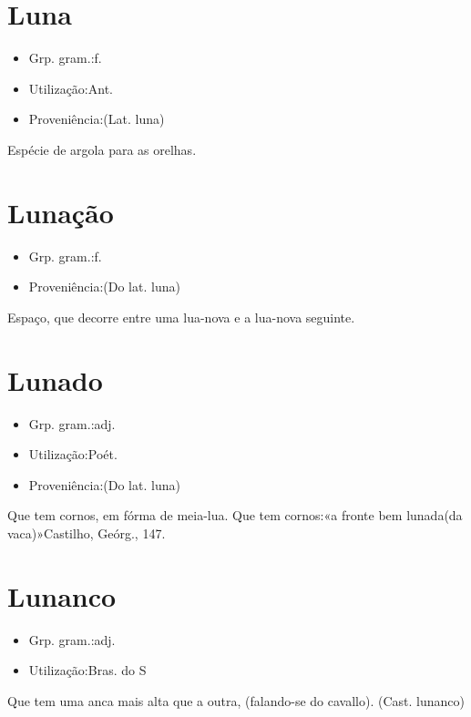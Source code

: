 \section{Luna}
\begin{itemize}
\item {Grp. gram.:f.}
\end{itemize}
\begin{itemize}
\item {Utilização:Ant.}
\end{itemize}
\begin{itemize}
\item {Proveniência:(Lat. \textunderscore luna\textunderscore )}
\end{itemize}
Espécie de argola para as orelhas.
\section{Lunação}
\begin{itemize}
\item {Grp. gram.:f.}
\end{itemize}
\begin{itemize}
\item {Proveniência:(Do lat. \textunderscore luna\textunderscore )}
\end{itemize}
Espaço, que decorre entre uma lua-nova e a lua-nova seguinte.
\section{Lunado}
\begin{itemize}
\item {Grp. gram.:adj.}
\end{itemize}
\begin{itemize}
\item {Utilização:Poét.}
\end{itemize}
\begin{itemize}
\item {Proveniência:(Do lat. \textunderscore luna\textunderscore )}
\end{itemize}
Que tem cornos, em fórma de meia-lua.
Que tem cornos:«\textunderscore a fronte bem lunada\textunderscore  (da vaca)»Castilho, \textunderscore Geórg.\textunderscore , 147.
\section{Lunanco}
\begin{itemize}
\item {Grp. gram.:adj.}
\end{itemize}
\begin{itemize}
\item {Utilização:Bras. do S}
\end{itemize}
Que tem uma anca mais alta que a outra, (falando-se do cavallo).
(Cast. \textunderscore lunanco\textunderscore )
